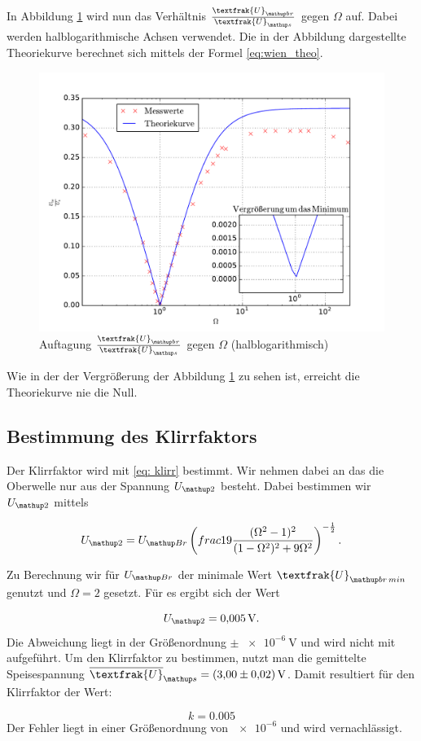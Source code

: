 In Abbildung \ref{fig: plot}
wird nun das Verhältnis $\frac{\textfrak{U}\ua{br}}{\textfrak{U}\ua{s}}$
gegen $\Omega$ auf. Dabei werden halblogarithmische Achsen verwendet. %
Die in der Abbildung dargestellte Theoriekurve berechnet sich mittels der Formel
\eqref{eq:wien_theo}.

\begin{figure}
  \centering
  \includegraphics[width=1\textwidth]{pics/ub_us.pdf}
  \caption{Auftagung $\frac{\textfrak{U}\ua{br}}{\textfrak{U}\ua{s}}$  gegen $\Omega$ (halblogarithmisch) }
  \label{fig: plot}
\end{figure}

Wie in der der Vergrößerung der Abbildung \ref{fig: plot} zu sehen ist, erreicht die %
Theoriekurve nie die Null.

\subsection{Bestimmung des Klirrfaktors}

Der Klirrfaktor wird mit \eqref{eq: klirr} bestimmt.
Wir nehmen dabei an das die Oberwelle nur aus der Spannung $U\ua{2}$ besteht. %
Dabei bestimmen wir $U\ua{2}$ mittels

\begin{equation*}
 U\ua{2}=U\ua{Br}\left(frac{1}{9} \frac{(\Omega^2 - 1)^2 }{(1 - \Omega ^2)^2 + 9 \Omega ^2}\right)^{-\frac{1}{2}}. %
\end{equation*}

Zu Berechnung wir für $U\ua{Br}$ der minimale Wert $\textfrak{U}\ua{br\,min}$ %
genutzt und $\Omega=2$ gesetzt.
Für es ergibt sich der Wert %

\begin{equation*}
 U\ua{2}=\SI{0.005}{\volt}.
\end{equation*}
Die Abweichung liegt in der Größenordnung $\pm \, \SI{e-6}{\volt}$ und
wird nicht mit aufgeführt.
Um den Klirrfaktor zu bestimmen, nutzt man die gemittelte Speisespannung
$\overline{\textfrak{U}}\ua{s}=\SI{3.0\pm0.02}{\volt}$.
Damit resultiert für den Klirrfaktor der Wert:

\begin{equation*}
k=0.005
\end{equation*}
Der Fehler liegt in einer Größenordnung von $\num{e-6}$ und wird vernachlässigt.
